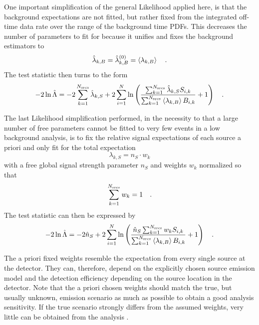 One important simplification of the general Likelihood applied here, is that the background expectations are not fitted, but rather fixed from the integrated off-time data rate over the range of the background time PDFs.
This decreases the number of parameters to fit for because it unifies and fixes the background estimators to
\begin{equation}
  \hat{\lambda}_{k,B} = \hat{\lambda}_{k,B}^{(0)} = \Braket{\lambda_{k,B}}
  \quad\text{.}
\end{equation}
The test statistic then turns to the form
\begin{equation}
  -2\ln\hat{\Lambda}
  = -2\sum_{k=1}^{N_\text{srcs}}\hat{\lambda}_{k,S} +
      2\sum_{i=1}^N \ln\left(
        \frac{\sum_{k=1}^{N_\text{srcs}}\hat{\lambda}_{k,S} S_{i,k}}
             {\sum_{k=1}^{N_\text{srcs}}\Braket{\lambda_{k,B}} B_{i,k}}
        + 1
      \right)
  \quad\text{.}
\end{equation}

The last Likelihood simplification performed, in the necessity to that a large number of free parameters cannot be fitted to very few events in a low background analysis, is to fix the relative signal expectations of each source a priori and only fit for the total expectation
\begin{equation}
  \label{equ:tdep_ts_general}
  \lambda_{k,S} = n_S \cdot w_k
\end{equation}
with a free global signal strength parameter $n_S$ and weights $w_k$ normalized so that
\begin{equation}
  \sum_{k=1}^{N_\text{srcs}} w_k = 1
  \quad\text{.}
\end{equation}
The test statistic can then be expressed by
\begin{equation}
  -2\ln\hat{\Lambda}
  = -2\hat{n}_S +
      2\sum_{i=1}^N \ln\left(
        \frac{\hat{n}_S \sum_{k=1}^{N_\text{srcs}} w_k S_{i,k}}
             {\sum_{k=1}^{N_\text{srcs}}\Braket{\lambda_{k,B}} B_{i,k}}
        + 1
      \right)
  \quad\text{.}
\end{equation}

The a priori fixed weights resemble the expectation from every single source at the detector.
They can, therefore, depend on the explicitly chosen source emission model and the detection efficiency depending on the source location in the detector.
Note that the a priori chosen weights should match the true, but usually unknown, emission scenario as much as possible to obtain a good analysis sensitivity.
If the true scenario strongly differs from the assumed weights, very little can be obtained from the analysis .


